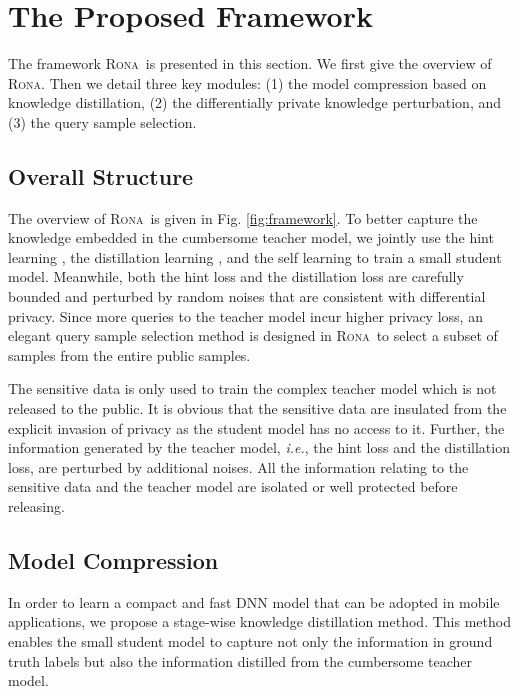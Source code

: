 \documentclass[letterpaper]{article} %
\newcommand*\system{\textsc{Rona}}
\begin{document}
\section{The Proposed Framework}
The framework \system\ is presented in this section. We first give the overview of \system. Then we detail three key modules: (1) the model compression based on knowledge distillation, (2) the differentially private knowledge perturbation, and (3) the query sample selection.

\subsection{Overall Structure}
The overview of \system\ is given in Fig. \ref{fig:framework}. To better capture the knowledge embedded in the cumbersome teacher model, we jointly use the hint learning \cite{romero2015fitnets}, the distillation learning \cite{hinton2015distilling}, and the self learning to train a small student model. Meanwhile, both the hint loss and the distillation loss are carefully bounded and perturbed by random noises that are consistent with differential privacy. Since more queries to the teacher model incur higher privacy loss, an elegant query sample selection method is designed in \system\ to select a subset of samples from the entire public samples.

The sensitive data is only used to train the complex teacher model which is not released to the public. It is obvious that the sensitive data are insulated from the explicit invasion of privacy as the student model has no access to it. Further, the information generated by the teacher model, \textit{i.e.}, the hint loss and the distillation loss, are perturbed by additional noises. All the information relating to the sensitive data and the teacher model are isolated or well protected before releasing.

\subsection{Model Compression}
In order to learn a compact and fast DNN model that can be adopted in mobile applications, we propose a stage-wise knowledge distillation method. This method enables the small student model to capture not only the information in ground truth labels but also the information distilled from the cumbersome teacher model.
\end{document}
